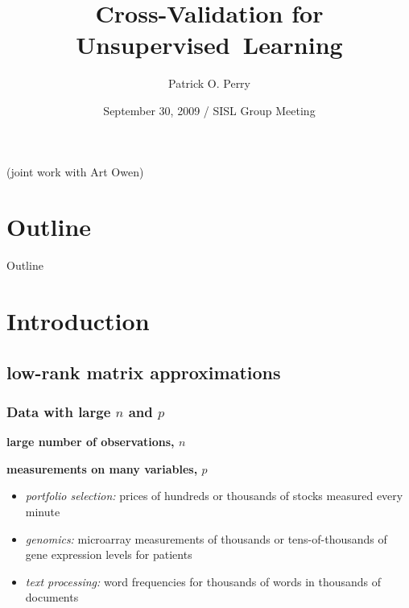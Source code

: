 \documentclass{beamer}
\title{Cross-Validation for Unsupervised~Learning}
\author[P. O. Perry]{Patrick O. Perry}
\institute[Harvard University] 
{
  Statistics and Information Sciences Laboratory\\
  Harvard University
}
\date[SISL Group Meeting]
{September 30, 2009 / SISL Group Meeting}
\begin{document}
\begin{frame}
  \titlepage
  \hfill\small{(joint work with Art Owen)}
\end{frame}

\section*{Outline}
\begin{frame}{Outline}
  \tableofcontents
\end{frame}


\section{Introduction}

\subsection{low-rank matrix approximations}
\begin{frame}
\frametitle{Data with large $n$ and $p$}
  \textbf{large number of observations, $n$}

  \textbf{measurements on many variables, $p$} 

  \begin{itemize}
  \item \textit{portfolio selection:} prices of hundreds or thousands of stocks measured every minute 
  \item \textit{genomics:} microarray measurements of thousands or tens-of-thousands of gene expression levels for patients
  \item \textit{text processing:} word frequencies for thousands of words in thousands of documents
  \end{itemize}
\end{frame}

\end{document}
